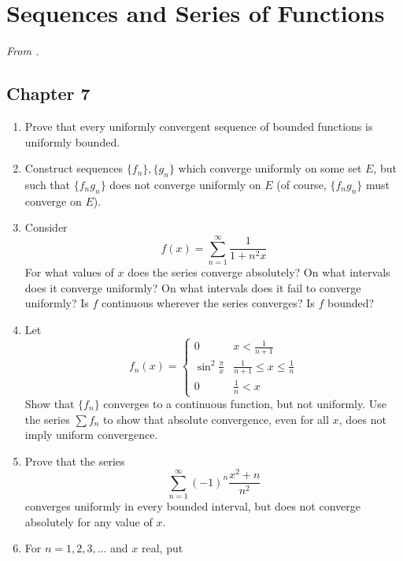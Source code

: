\documentclass[../psets.tex]{subfiles}
\begin{document}
\section{Sequences and Series of Functions}
\emph{From \textcite{bib:Rudin}.}
\subsection*{Chapter 7}
\begin{enumerate}[label={\textbf{\arabic*.}}]
    \item {}Prove that every uniformly convergent sequence of bounded functions is uniformly bounded.
    \item Construct sequences $\{f_n\},\{g_n\}$ which converge uniformly on some set $E$, but such that $\{f_ng_n\}$ does not converge uniformly on $E$ (of course, $\{f_ng_n\}$ must converge on $E$).
    \item Consider
    \begin{equation*}
        f(x) = \sum_{n=1}^\infty\frac{1}{1+n^2x}
    \end{equation*}
    For what values of $x$ does the series converge absolutely? On what intervals does it converge uniformly? On what intervals does it fail to converge uniformly? Is $f$ continuous wherever the series converges? Is $f$ bounded?
    \item Let
    \begin{equation*}
        f_n(x) =
        \begin{cases}
            0 & x<\frac{1}{n+1}\\
            \sin^2\frac{\pi}{x} & \frac{1}{n+1}\leq x\leq\frac{1}{n}\\
            0 & \frac{1}{n}<x
        \end{cases}
    \end{equation*}
    Show that $\{f_n\}$ converges to a continuous function, but not uniformly. Use the series $\sum f_n$ to show that absolute convergence, even for all $x$, does not imply uniform convergence.
    \item Prove that the series
    \begin{equation*}
        \sum_{n=1}^\infty(-1)^n\frac{x^2+n}{n^2}
    \end{equation*}
    converges uniformly in every bounded interval, but does not converge absolutely for any value of $x$.
    \item For $n=1,2,3,\dots$ and $x$ real, put
    \begin{equation*}

\end{equation*}
\end{enumerate}
\end{document}
